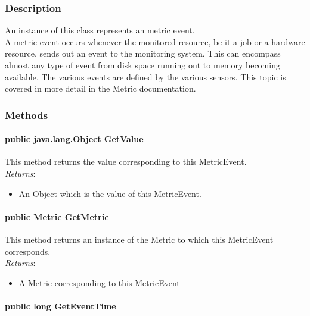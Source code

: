 \documentclass[$Date: 2003/06/26 19:29:31 $]{glabarticle}
\begin{document}
\subsubsection{Description}

An instance of this class represents an metric event. \\

A metric event occurs whenever the monitored resource, be it a job or a hardware resource, sends out an
event to the monitoring system. This can encompass almost any type of event from disk space running
out to memory becoming  available. The various events are defined by the various sensors. This topic
is covered in more detail in the Metric documentation. \\ 


\subsubsection{Methods}

\paragraph{public java.lang.Object GetValue}

This method returns the value corresponding to this MetricEvent.\\

\textit{Returns}:
\begin{itemize}
\item[] An Object which is the value of this MetricEvent.
\end{itemize}

\paragraph{public Metric GetMetric}

This method returns an instance of the Metric to which this MetricEvent corresponds. \\

\textit{Returns}:
\begin{itemize}
\item[] A Metric corresponding to this MetricEvent
\end{itemize}

\paragraph{public long GetEventTime}
\end{document}
